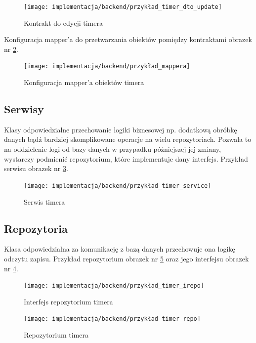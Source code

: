 \documentclass[a4paper,11pt]{report}
\begin{document}
\begin{figure}[H]
	\centering
	\texttt{[image: implementacja/backend/przykład\_timer\_dto\_update]}\\
	\caption{Kontrakt do edycji timera}
	\label{fig:przykład_timer_dto_update}
\end{figure}
Konfiguracja mapper'a do przetwarzania obiektów pomiędzy kontraktami obrazek nr \ref{fig:przykład_mappera}.
\begin{figure}[H]
	\centering
	\texttt{[image: implementacja/backend/przykład\_mappera]}\\
	\caption{Konfiguracja mapper'a obiektów timera}
	\label{fig:przykład_mappera}
\end{figure}


\subsection{Serwisy}
Klasy odpowiedzialne przechowanie logiki biznesowej np. dodatkową obróbkę danych bądź bardziej skomplikowane operacje na wielu repozytoriach.
Pozwala to na oddzielenie logi od bazy danych w przypadku późniejszej jej zmiany, wystarczy podmienić repozytorium, które implementuje dany interfejs.
Przykład serwisu obrazek nr \ref{fig:przykład_timer_service}.
\begin{figure}[H]
	\centering
	\texttt{[image: implementacja/backend/przykład\_timer\_service]}\\
	\caption{Serwis timera}
	\label{fig:przykład_timer_service}
\end{figure}
\subsection{Repozytoria}
Klasa odpowiedzialna za komunikację z bazą danych przechowuje ona logikę odczytu zapisu. 
Przykład repozytorium obrazek nr \ref{fig:przykład_timer_repo} oraz jego interfejsu obrazek nr \ref{fig:przykład_timer_irepo}.
\begin{figure}[H]
	\centering
	\texttt{[image: implementacja/backend/przykład\_timer\_irepo]}\\
	\caption{Interfejs repozytorium timera}
	\label{fig:przykład_timer_irepo}
\end{figure}
\begin{figure}[H]
	\centering
	\texttt{[image: implementacja/backend/przykład\_timer\_repo]}\\
	\caption{Repozytorium timera}
	\label{fig:przykład_timer_repo}
\end{figure}
\end{document}
